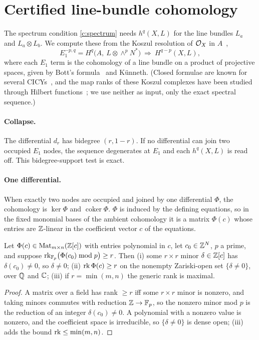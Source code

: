 \section{Certified line-bundle cohomology}
\label{sec:cohomology}

The spectrum condition \ref{c:spectrum} needs $h^q(X,L)$ for the line bundles
$L_a$ and $L_a\otimes L_b$. We compute these from the Koszul resolution of
$\mathcal{O}_X$ in $A$~\cite{Hubsch1992,AGHL2010},
\[
E_1^{-p,q}=H^q\bigl(A,\ L\otimes\wedge^pN^*\bigr)\ \Longrightarrow\ H^{q-p}(X,L),
\]
where each $E_1$ term is the cohomology of a line bundle on a product of
projective spaces, given by Bott's formula~\cite{Bott1957} and Künneth. (Closed
formulae are known for several CICYs~\cite{CL2018}, and the map ranks of these
Koszul complexes have been studied through Hilbert functions~\cite{Wang2026}; we
use neither as input, only the exact spectral sequence.)

\paragraph{Collapse.} The differential $d_r$ has bidegree $(r,1-r)$. If no
differential can join two occupied $E_1$ nodes, the sequence degenerates at
$E_1$ and each $h^q(X,L)$ is read off. This bidegree-support test is exact.

\paragraph{One differential.} When exactly two nodes are occupied and joined by
one differential $\Phi$, the cohomology is $\ker\Phi$ and $\operatorname{coker}\Phi$.
$\Phi$ is induced by the defining equations, so in the fixed monomial bases of
the ambient cohomology it is a matrix $\Phi(c)$ whose entries are $\mathbb{Z}$-linear in
the coefficient vector $c$ of the equations.

\begin{proposition}\label{prop:rank}
Let $\Phi(c)\in\mathrm{Mat}_{m\times n}(\mathbb{Z}[c])$ with entries polynomial in $c$,
let $c_0\in\mathbb{Z}^N$, $p$ a prime, and suppose $\operatorname{rk}_{\mathbb{F}_p}\bigl(\Phi(c_0)\bmod p\bigr)\ge r$.
Then (i) some $r\times r$ minor $\delta\in\mathbb{Z}[c]$ has $\delta(c_0)\ne0$, so
$\delta\ne0$; (ii) $\operatorname{rk}\Phi(c)\ge r$ on the nonempty Zariski-open set
$\{\delta\ne0\}$, over $\mathbb{Q}$ and $\mathbb{C}$; (iii) if $r=\min(m,n)$ the generic rank is
maximal.
\end{proposition}
\begin{proof}
A matrix over a field has rank $\ge r$ iff some $r\times r$ minor is nonzero,
and taking minors commutes with reduction $\mathbb{Z}\to\mathbb{F}_p$, so the nonzero minor mod
$p$ is the reduction of an integer $\delta(c_0)\ne0$. A polynomial with a nonzero
value is nonzero, and the coefficient space is irreducible, so
$\{\delta\ne0\}$ is dense open; (iii) adds the bound $\operatorname{rk}\le\min(m,n)$.
\end{proof}

